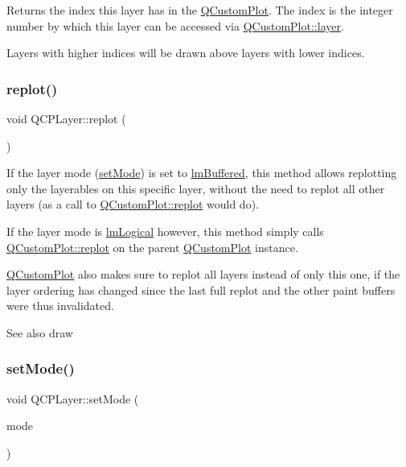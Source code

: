 Returns the index this layer has in the \hyperlink{classQCustomPlot}{Q\+Custom\+Plot}. The index is the integer number by which this layer can be accessed via \hyperlink{classQCustomPlot_a0a96244e7773b242ef23c32b7bdfb159}{Q\+Custom\+Plot\+::layer}.

Layers with higher indices will be drawn above layers with lower indices. \mbox{\label{classQCPLayer_adefd53b6db02f470151c416f42e37180}} 
\subsubsection{\texorpdfstring{replot()}{replot()}}
{\footnotesize\ttfamily void Q\+C\+P\+Layer\+::replot (\begin{DoxyParamCaption}{ }\end{DoxyParamCaption})}

If the layer mode (\hyperlink{classQCPLayer_a938d57b04f4e4c23cedf1711f983919b}{set\+Mode}) is set to \hyperlink{classQCPLayer_a67dcfc1590be2a1f2227c5a39bb59c7cab581b9fab3007c4c65f057f4185d7538}{lm\+Buffered}, this method allows replotting only the layerables on this specific layer, without the need to replot all other layers (as a call to \hyperlink{classQCustomPlot_aa4bfe7d70dbe67e81d877819b75ab9af}{Q\+Custom\+Plot\+::replot} would do).

If the layer mode is \hyperlink{classQCPLayer_a67dcfc1590be2a1f2227c5a39bb59c7ca02eb5e9a4cb7f1baf1e2b6b99e3b87ce}{lm\+Logical} however, this method simply calls \hyperlink{classQCustomPlot_aa4bfe7d70dbe67e81d877819b75ab9af}{Q\+Custom\+Plot\+::replot} on the parent \hyperlink{classQCustomPlot}{Q\+Custom\+Plot} instance.

\hyperlink{classQCustomPlot}{Q\+Custom\+Plot} also makes sure to replot all layers instead of only this one, if the layer ordering has changed since the last full replot and the other paint buffers were thus invalidated.

\begin{DoxySeeAlso}{See also}
draw 
\end{DoxySeeAlso}
\mbox{\label{classQCPLayer_a938d57b04f4e4c23cedf1711f983919b}} 
\subsubsection{\texorpdfstring{set\+Mode()}{setMode()}}
{\footnotesize\ttfamily void Q\+C\+P\+Layer\+::set\+Mode (\begin{DoxyParamCaption}\item[{\hyperlink{classQCPLayer_a67dcfc1590be2a1f2227c5a39bb59c7c}{Q\+C\+P\+Layer\+::\+Layer\+Mode}}]{mode }\end{DoxyParamCaption})}

